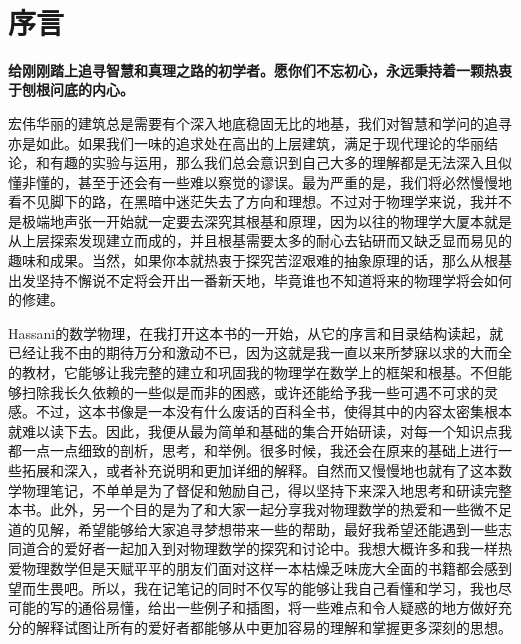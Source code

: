 \documentclass[mathserif,hyperref,UTF8,openany,b5paper]{ctexbook}
\begin{document}
\thispagestyle{empty}
\newpage 
\
\newpage
\thispagestyle{empty}
\section{序言}
\textbf{给刚刚踏上追寻智慧和真理之路的初学者。愿你们不忘初心，永远秉持着一颗热衷于刨根问底的内心。}

宏伟华丽的建筑总是需要有个深入地底稳固无比的地基，我们对智慧和学问的追寻亦是如此。如果我们一味的追求处在高出的上层建筑，满足于现代理论的华丽结论，和有趣的实验与运用，那么我们总会意识到自己大多的理解都是无法深入且似懂非懂的，甚至于还会有一些难以察觉的谬误。最为严重的是，我们将必然慢慢地看不见脚下的路，在黑暗中迷茫失去了方向和理想。不过对于物理学来说，我并不是极端地声张一开始就一定要去深究其根基和原理，因为以往的物理学大厦本就是从上层探索发现建立而成的，并且根基需要太多的耐心去钻研而又缺乏显而易见的趣味和成果。当然，如果你本就热衷于探究苦涩艰难的抽象原理的话，那么从根基出发坚持不懈说不定将会开出一番新天地，毕竟谁也不知道将来的物理学将会如何的修建。

Hassani的数学物理，在我打开这本书的一开始，从它的序言和目录结构读起，就已经让我不由的期待万分和激动不已，因为这就是我一直以来所梦寐以求的大而全的教材，它能够让我完整的建立和巩固我的物理学在数学上的框架和根基。不但能够扫除我长久依赖的一些似是而非的困惑，或许还能给予我一些可遇不可求的灵感。不过，这本书像是一本没有什么废话的百科全书，使得其中的内容太密集根本就难以读下去。因此，我便从最为简单和基础的集合开始研读，对每一个知识点我都一点一点细致的剖析，思考，和举例。很多时候，我还会在原来的基础上进行一些拓展和深入，或者补充说明和更加详细的解释。自然而又慢慢地也就有了这本数学物理笔记，不单单是为了督促和勉励自己，得以坚持下来深入地思考和研读完整本书。此外，另一个目的是为了和大家一起分享我对物理数学的热爱和一些微不足道的见解，希望能够给大家追寻梦想带来一些的帮助，最好我希望还能遇到一些志同道合的爱好者一起加入到对物理数学的探究和讨论中。我想大概许多和我一样热爱物理数学但是天赋平平的朋友们面对这样一本枯燥乏味庞大全面的书籍都会感到望而生畏吧。所以，我在记笔记的同时不仅写的能够让我自己看懂和学习，我也尽可能的写的通俗易懂，给出一些例子和插图，将一些难点和令人疑惑的地方做好充分的解释试图让所有的爱好者都能够从中更加容易的理解和掌握更多深刻的思想。
\end{document}
